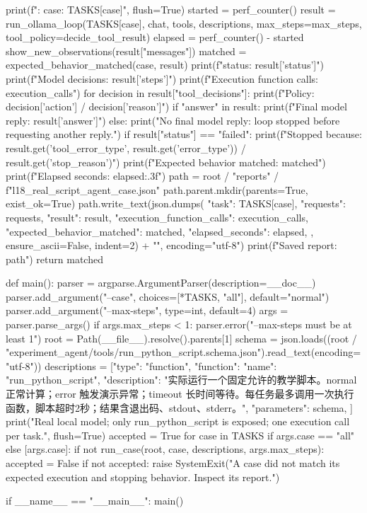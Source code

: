\documentclass[UTF8,zihao=-4,fontset=fandol]{ctexart}
\begin{document}
\begin{Code}
    print(f"\nCase: {case}\nTask: {TASKS[case]}", flush=True)
    started = perf_counter()
    result = run_ollama_loop(TASKS[case], chat, tools, descriptions,
                             max_steps=max_steps, tool_policy=decide_tool_result)
    elapsed = perf_counter() - started
    show_new_observations(result["messages"])
    matched = expected_behavior_matched(case, result)
    print(f"\nLoop status: {result['status']}")
    print(f"Model decisions: {result['steps']}")
    print(f"Execution function calls: {execution_calls}")
    for decision in result["tool_decisions"]:
        print(f"Policy: {decision['action']} / {decision['reason']}")
    if "answer" in result:
        print(f"Final model reply: {result['answer']}")
    else:
        print("No final model reply: loop stopped before requesting another reply.")
    if result["status"] == "failed":
        print(f"Stopped because: {result.get('tool_error_type', result.get('error_type'))} / {result.get('stop_reason')}")
    print(f"Expected behavior matched: {matched}")
    print(f"Elapsed seconds: {elapsed:.3f}")
    path = root / "reports" / f"l18_real_script_agent_{case}.json"
    path.parent.mkdir(parents=True, exist_ok=True)
    path.write_text(json.dumps({
        "task": TASKS[case], "requests": requests, "result": result,
        "execution_function_calls": execution_calls, "expected_behavior_matched": matched,
        "elapsed_seconds": elapsed,
    }, ensure_ascii=False, indent=2) + "\n", encoding="utf-8")
    print(f"Saved report: {path}")
    return matched


def main():
    parser = argparse.ArgumentParser(description=__doc__)
    parser.add_argument("--case", choices=[*TASKS, "all"], default="normal")
    parser.add_argument("--max-steps", type=int, default=4)
    args = parser.parse_args()
    if args.max_steps < 1:
        parser.error("--max-steps must be at least 1")
    root = Path(__file__).resolve().parents[1]
    schema = json.loads((root / "experiment_agent/tools/run_python_script.schema.json").read_text(encoding="utf-8"))
    descriptions = [{"type": "function", "function": {
        "name": "run_python_script",
        "description": "实际运行一个固定允许的教学脚本。normal 正常计算；error 触发演示异常；timeout 长时间等待。每任务最多调用一次执行函数，脚本超时2秒；结果含退出码、stdout、stderr。",
        "parameters": schema,
    }}]
    print("Real local model; only run_python_script is exposed; one execution call per task.", flush=True)
    accepted = True
    for case in TASKS if args.case == "all" else [args.case]:
        if not run_case(root, case, descriptions, args.max_steps):
            accepted = False
    if not accepted:
        raise SystemExit("A case did not match its expected execution and stopping behavior. Inspect its report.")


if __name__ == "__main__":
    main()
\end{Code}
\end{document}
